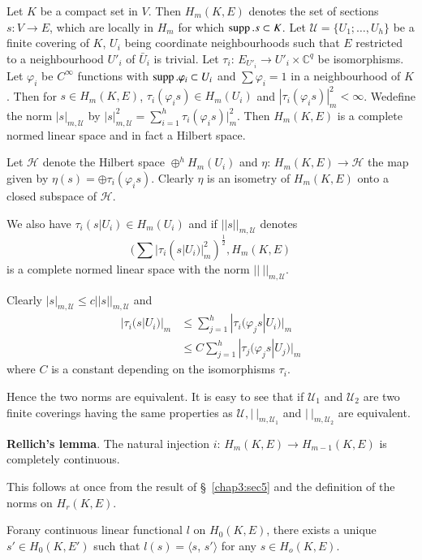 Let $K$ be a compact set in $V$. Then $H_m (K, E)$ denotes the set of
sections $s : V \to E$, which are locally in $H_m$ for which $\operatorname{supp}. s
\subset K$. Let $\mathscr{U} = \{ U_1 ; \ldots , U_h \}$ be a finite
covering of $K$, $U_i$ being coordinate neighbourhoods such that $E$
restricted to a neighbourhood $U'_i$ of $\bar{U}_i$ is trivial. Let
$\tau_i$: $E_{U'_i} \to U'_i \times \mathbb{C}^q$ be isomorphisms. Let
$\varphi_i$ be $C^\infty$ functions with $\operatorname{supp}. \varphi_i \subset
U_i$ and $\sum \varphi_i = 1$ in a neighbourhood of $K$. Then for $s
\in H_m (K, E)$, $\tau_i (\varphi_i s) \in H_m (U_i)$ and $|\tau_i
(\varphi_i s) |^2_m < \infty$. We\pageoriginale define the norm $|s|_{m,
  \mathscr{U}}$ by $|s|^2_{m, \mathscr{U}} = \sum \limits_{i=1}^h
\tau_i (\varphi_i s)|^2_m$. Then $H_m(K, E)$ is a complete normed
linear space and in fact a Hilbert space. 

Let $\mathscr{H}$ denote the Hilbert space $\oplus^h H_m (U_i)$ and
$\eta$: $H_m (K, E) \to \mathscr{H}$ the map given by $\eta(s) =
\oplus \tau_i (\varphi_i s)$. Clearly $\eta$ is an isometry of $H_m(K,
E)$ onto a closed subspace of $\mathscr{H}$. 

We also have $\tau_i (s | U_i) \in H_m (U_i)$ and if $|| s ||_{m,
  \mathscr{U}}$ denotes 
$$(\sum | \tau_i(s|U_i)|^2_m)^{\frac{1}{2}}, H_m (K, E)$$ 
is a complete normed linear space with the norm $|| ~ ||_{m, \mathscr{U}}$. 

Clearly $|s|_{m, \mathscr{U}} \leq c || s ||_{m , \mathscr{U}}$ and
\begin{align*}
  |\tau_i (s | U_i)|_m & \leq \sum^h_{j=1} |\tau_i (\varphi_j s | U_i) |_m\\
  & \leq C \sum^h_{j = 1} |\tau_j (\varphi_j s | U_j)|_m
\end{align*}
where $C$ is a constant depending on the isomorphisms $\tau_i$.

Hence the two norms are equivalent. It is easy to see that if
$\mathscr{U}_1$ and $\mathscr{U}_2$ are two finite coverings having
the same properties as $\mathscr{U}, | ~ |_{m , \mathscr{U}_1}$ and $|
~ |_{m, \mathscr{U}_2}$ are equivalent. 

\medskip
\noindent
\textbf{Rellich's lemma}. The natural injection $i$: $H_m (K, E) \to
H_{m-1} (K, E)$ is completely continuous. 

This follows at once from the result of \S\ \ref{chap3:sec5} and the
definition of the norms on $H_r (K, E)$. 

\setcounter{proposition}{0}
\begin{proposition}\label{chap3:sec9:prop1} %
  For\pageoriginale any continuous linear functional $l$ on $H_0 (K, E)$, there
  exists a unique $s' \in H_0 (K, E')$ such that $l(s) = \langle s$,
  $s' \rangle $ for any $s \in H_o (K, E)$. 
\end{proposition}

